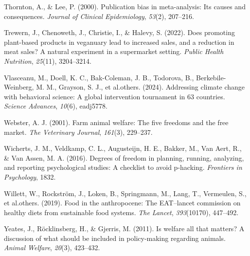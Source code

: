 \documentclass[
  man]{apa6}
\newlength{\cslhangindent}
\newenvironment{CSLReferences}[2] %
 {\begin{list}{}{%
  \setlength{\itemindent}{0pt}
  \setlength{\leftmargin}{0pt}
  \setlength{\parsep}{0pt}
  \ifodd #1
   \setlength{\leftmargin}{\cslhangindent}
   \setlength{\itemindent}{-1\cslhangindent}
  \fi
  \setlength{\itemsep}{#2\baselineskip}}}
 {\end{list}}
\begin{document}
\begin{CSLReferences}{1}{0}
Thornton, A., \& Lee, P. (2000). Publication bias in meta-analysis: Its causes and consequences. \emph{Journal of Clinical Epidemiology}, \emph{53}(2), 207--216.

Trewern, J., Chenoweth, J., Christie, I., \& Halevy, S. (2022). Does promoting plant-based products in veganuary lead to increased sales, and a reduction in meat sales? A natural experiment in a supermarket setting. \emph{Public Health Nutrition}, \emph{25}(11), 3204--3214.

Vlasceanu, M., Doell, K. C., Bak-Coleman, J. B., Todorova, B., Berkebile-Weinberg, M. M., Grayson, S. J., et al.others. (2024). Addressing climate change with behavioral science: A global intervention tournament in 63 countries. \emph{Science Advances}, \emph{10}(6), eadj5778.

Webster, A. J. (2001). Farm animal welfare: The five freedoms and the free market. \emph{The Veterinary Journal}, \emph{161}(3), 229--237.

Wicherts, J. M., Veldkamp, C. L., Augusteijn, H. E., Bakker, M., Van Aert, R., \& Van Assen, M. A. (2016). Degrees of freedom in planning, running, analyzing, and reporting psychological studies: A checklist to avoid p-hacking. \emph{Frontiers in Psychology}, 1832.

Willett, W., Rockström, J., Loken, B., Springmann, M., Lang, T., Vermeulen, S., et al.others. (2019). Food in the anthropocene: The EAT--lancet commission on healthy diets from sustainable food systems. \emph{The Lancet}, \emph{393}(10170), 447--492.

Yeates, J., Röcklinsberg, H., \& Gjerris, M. (2011). Is welfare all that matters? A discussion of what should be included in policy-making regarding animals. \emph{Animal Welfare}, \emph{20}(3), 423--432.

\end{CSLReferences}
\end{document}
